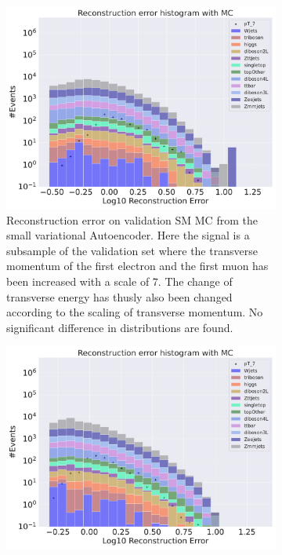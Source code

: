 \begin{figure}[h!]
    \centering
    \begin{subfigure}{.45\textwidth}
        \includegraphics[width=\textwidth]{Figures/VAE_testing/small/b_data_recon_big_rm3_feats_sig_pT_7.pdf}
        \caption{Reconstruction error on validation SM MC from the small variational Autoencoder. Here the signal is a subsample of the validation 
        set where the transverse momentum of the first electron and the first muon has been increased with a scale of $7$. The change of transverse 
        energy has thusly also been changed according to the scaling of transverse momentum. No significant difference in distributions are found. }
        \label{fig:VAE_small_pt_7}
    \end{subfigure}
    \hfill 
    \begin{subfigure}{.45\textwidth}
        \includegraphics[width=\textwidth]{Figures/VAE_testing/big/b_data_recon_big_rm3_feats_sig_pT_7.pdf}

\end{subfigure}
\end{figure}
